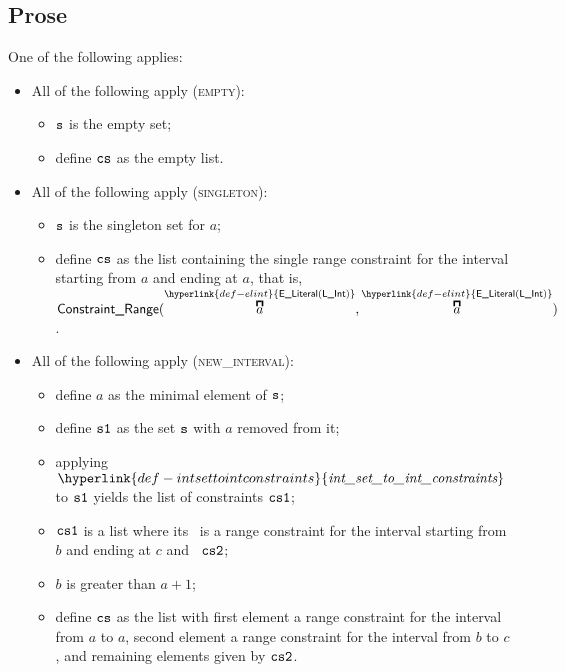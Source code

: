 \documentclass{book}
\newcommand\ELInt[1]{\overbracket{#1}^{\hyperlink{def-elint}{\ELiteral(\lint)}}}
\newcommand\intsettointconstraints[0]{\hyperlink{def-intsettointconstraints}{\textfunc{int\_set\_to\_int\_constraints}}}
\begin{document}
\subsection{Prose}
One of the following applies:
\begin{itemize}
  \item All of the following apply (\textsc{empty}):
  \begin{itemize}
    \item $\texttt{s}$ is the empty set;
    \item define $\texttt{cs}$ as the empty list.
  \end{itemize}

  \item All of the following apply (\textsc{singleton}):
  \begin{itemize}
    \item $\texttt{s}$ is the singleton set for $a$;
    \item define $\texttt{cs}$ as the list containing the single range constraint for the interval starting from $a$
          and ending at $a$, that is, $\ConstraintRange(\ELInt{a}, \ELInt{a})$.
  \end{itemize}

  \item All of the following apply (\textsc{new\_interval}):
  \begin{itemize}
    \item define $a$ as the minimal element of $\texttt{s}$;
    \item define $\texttt{s1}$ as the set $\texttt{s}$ with $a$ removed from it;
    \item applying $\intsettointconstraints$ to $\texttt{s1}$ yields the list of constraints $\texttt{cs1}$;
    \item $\texttt{cs1}$ is a list where its \head\ is a range constraint for the interval starting from $b$ and ending at $c$
          and \tail\ $\texttt{cs2}$;
    \item $b$ is greater than $a+1$;
    \item define $\texttt{cs}$ as the list with first element a range constraint for the interval from $a$ to $a$,
          second element a range constraint for the interval from $b$ to $c$, and remaining elements given by $\texttt{cs2}$.
  \end{itemize}


\end{itemize}
\end{document}
